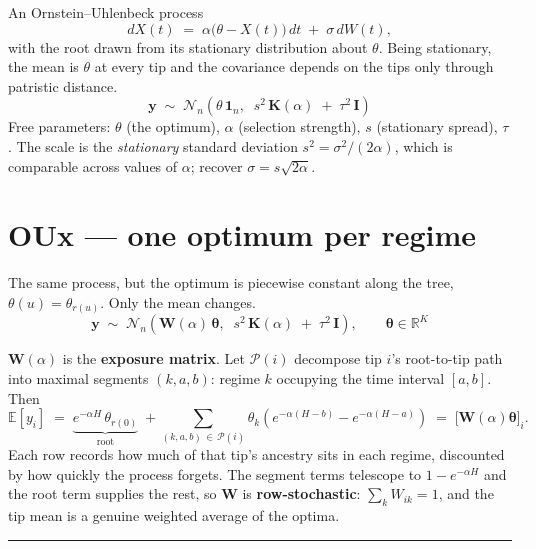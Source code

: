 \documentclass[11pt]{article}
\newcommand{\yv}{\mathbf{y}}
\newcommand{\Idm}{\mathbf{I}}
\newcommand{\Km}{\mathbf{K}}
\newcommand{\Wm}{\mathbf{W}}
\newcommand{\one}{\mathbf{1}}
\newcommand{\thetav}{\boldsymbol{\theta}}
\newcommand{\E}{\mathbb{E}}
\begin{document}
An Ornstein--Uhlenbeck process
\[
dX(t) \;=\; \alpha\bigl(\theta - X(t)\bigr)\,dt \;+\; \sigma\,dW(t),
\]
with the root drawn from its stationary distribution about $\theta$. Being stationary, the mean is
$\theta$ at every tip and the covariance depends on the tips only through patristic distance.
\begin{equation*}
\boxed{\;
\yv \;\sim\; \mathcal{N}_{n}\!\left(\theta\,\one_{n},\;\;
   s^{2}\,\Km(\alpha) \;+\; \tau^{2}\,\Idm\right)
\;}
\end{equation*}
Free parameters: $\theta$ (the optimum), $\alpha$ (selection strength), $s$ (stationary spread),
$\tau$. The scale is the \emph{stationary} standard deviation $s^{2} = \sigma^{2}/(2\alpha)$, which
is comparable across values of $\alpha$; recover $\sigma = s\sqrt{2\alpha}$.

\vspace{8pt}

\section*{OUx --- one optimum per regime}

The same process, but the optimum is piecewise constant along the tree,
$\theta(u) = \theta_{r(u)}$. Only the mean changes.
\begin{equation*}
\boxed{\;
\yv \;\sim\; \mathcal{N}_{n}\!\left(\Wm(\alpha)\,\thetav,\;\;
   s^{2}\,\Km(\alpha) \;+\; \tau^{2}\,\Idm\right),
\qquad \thetav \in \mathbb{R}^{K}
\;}
\end{equation*}

\noindent
$\Wm(\alpha)$ is the \textbf{exposure matrix}. Let $\mathcal{P}(i)$ decompose tip $i$'s root-to-tip
path into maximal segments $(k,a,b)$: regime $k$ occupying the time interval $[a,b]$. Then
\begin{equation*}
\E[y_i] \;=\; \underbrace{e^{-\alpha H}\,\theta_{r(0)}}_{\text{root}}
   \;+\!\! \sum_{(k,a,b)\,\in\,\mathcal{P}(i)}\!\! \theta_{k}
   \left(e^{-\alpha(H-b)} - e^{-\alpha(H-a)}\right)
   \;=\; \bigl[\Wm(\alpha)\thetav\bigr]_{i} .
\end{equation*}
Each row records how much of that tip's ancestry sits in each regime, discounted by how quickly the
process forgets. The segment terms telescope to $1 - e^{-\alpha H}$ and the root term supplies the
rest, so $\Wm$ is \textbf{row-stochastic}: $\sum_{k} W_{ik} = 1$, and the tip mean is a genuine
weighted average of the optima.

\vspace{8pt}
\hrule
\vspace{8pt}
\end{document}
